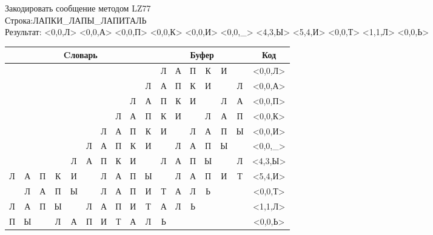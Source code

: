 \documentclass[a4paper, 12pt]{article}
\begin{document}
Закодировать сообщение методом LZ77\\
Строка:ЛАПКИ\_ЛАПЫ\_ЛАПИТАЛЬ\\
Результат: <0,0,Л> <0,0,А> <0,0,П> <0,0,К> <0,0,И> <0,0,\_> <4,3,Ы> <5,4,И> <0,0,Т> <1,1,Л> <0,0,Ь>\\
\begin{table}[h!]
\centering
\begin{tabular}{|c|c|c|c|c|c|c|c|c|c|c|c|c|c|c|c|c|} 
\hline
\multicolumn{10}{|c|}{Cловарь} & \multicolumn{6}{c|}{Буфер} & Код  \\ \hline
  &   &   &   &   &   &   &   &   &   & \cellcolor[HTML]{8CE4F6} Л & А & П & К & И &   & <0,0,Л>
\\ \hline
  &   &   &   &   &   &   &   &   & Л & \cellcolor[HTML]{8CE4F6} А & П & К & И &   & Л & <0,0,А>
\\ \hline
  &   &   &   &   &   &   &   & Л & А & \cellcolor[HTML]{8CE4F6} П & К & И &   & Л & А & <0,0,П>
\\ \hline
  &   &   &   &   &   &   & Л & А & П & \cellcolor[HTML]{8CE4F6} К & И &   & Л & А & П & <0,0,К>
\\ \hline
  &   &   &   &   &   & Л & А & П & К & \cellcolor[HTML]{8CE4F6} И &   & Л & А & П & Ы & <0,0,И>
\\ \hline
  &   &   &   &   & Л & А & П & К & И & \cellcolor[HTML]{8CE4F6}   & Л & А & П & Ы &   & <0,0,\_>
\\ \hline
  &   &   &   & \cellcolor[HTML]{FFFF00} Л & \cellcolor[HTML]{FFFF00} А & \cellcolor[HTML]{FFFF00} П & К & И &   & \cellcolor[HTML]{FFFF00} Л & \cellcolor[HTML]{FFFF00} А & \cellcolor[HTML]{FFFF00} П & \cellcolor[HTML]{8CE4F6} Ы &   & Л & <4,3,Ы>
\\ \hline
Л & А & П & К & И & \cellcolor[HTML]{FFFF00}   & \cellcolor[HTML]{FFFF00} Л & \cellcolor[HTML]{FFFF00} А & \cellcolor[HTML]{FFFF00} П & Ы & \cellcolor[HTML]{FFFF00}   & \cellcolor[HTML]{FFFF00} Л & \cellcolor[HTML]{FFFF00} А & \cellcolor[HTML]{FFFF00} П & \cellcolor[HTML]{8CE4F6} И & Т & <5,4,И>
\\ \hline
  & Л & А & П & Ы &   & Л & А & П & И & \cellcolor[HTML]{8CE4F6} Т & А & Л & Ь &   &   & <0,0,Т>
\\ \hline
Л & \cellcolor[HTML]{FFFF00} А & П & Ы &   & Л & А & П & И & Т & \cellcolor[HTML]{FFFF00} А & \cellcolor[HTML]{8CE4F6} Л & Ь &   &   &   & <1,1,Л>
\\ \hline
П & Ы &   & Л & А & П & И & Т & А & Л & \cellcolor[HTML]{8CE4F6} Ь &   &   &   &   &   & <0,0,Ь>
\\ \hline
\end{tabular}
\end{table}
\end{document}
